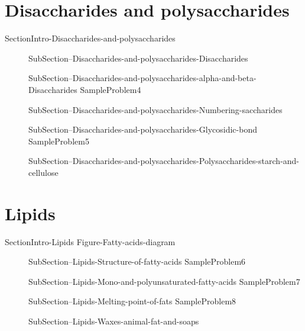 \documentclass[main.tex]{subfiles}
\begin{document}
\section{ \faEnvira Disaccharides and polysaccharides}
  {SectionIntro-Disaccharides-and-polysaccharides}
\sloppy\begin{description}
\item[] {SubSection--Disaccharides-and-polysaccharides-Disaccharides}
\item[] {SubSection--Disaccharides-and-polysaccharides-alpha-and-beta-Disaccharides}
  {SampleProblem4}
\item[] {SubSection--Disaccharides-and-polysaccharides-Numbering-saccharides}
\item[] {SubSection--Disaccharides-and-polysaccharides-Glycosidic-bond}
  {SampleProblem5}
\item[] 
{SubSection--Disaccharides-and-polysaccharides-Polysaccharides-starch-and-cellulose}
\end{description}
\section{ \faEnvira Lipids}
{SectionIntro-Lipids}
  {Figure-Fatty-acids-diagram}
\sloppy\begin{description}
\item[] {SubSection--Lipids-Structure-of-fatty-acids}
  {SampleProblem6}
\item[] {SubSection--Lipids-Mono-and-polyunsaturated-fatty-acids}
  {SampleProblem7}
\item[]{SubSection--Lipids-Melting-point-of-fats}
  {SampleProblem8}
\item[] 
{SubSection--Lipids-Waxes-animal-fat-and-soaps}
\end{description}
\end{document}
